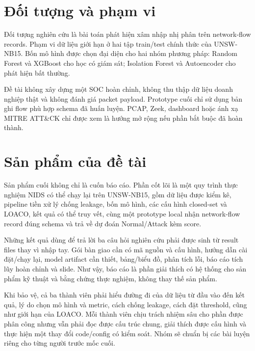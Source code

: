 \documentclass[12pt,a4paper,oneside]{report}
\begin{document}
\section{Đối tượng và phạm vi}

Đối tượng nghiên cứu là bài toán phát hiện xâm nhập nhị phân trên network-flow records. Phạm vi dữ liệu giới hạn ở hai tập train/test chính thức của UNSW-NB15. Bốn mô hình được chọn đại diện cho hai nhóm phương pháp: Random Forest và XGBoost cho học có giám sát; Isolation Forest và Autoencoder cho phát hiện bất thường.

Đề tài không xây dựng một SOC hoàn chỉnh, không thu thập dữ liệu doanh nghiệp thật và không đánh giá packet payload. Prototype cuối chỉ sử dụng bản ghi flow phù hợp schema đã huấn luyện. PCAP, Zeek, dashboard hoặc ánh xạ MITRE ATT\&CK chỉ được xem là hướng mở rộng nếu phần bắt buộc đã hoàn thành.

\clearpage
\section{Sản phẩm của đề tài}

Sản phẩm cuối không chỉ là cuốn báo cáo. Phần cốt lõi là một quy trình thực nghiệm NIDS có thể chạy lại trên UNSW-NB15, gồm dữ liệu được kiểm kê, pipeline tiền xử lý chống leakage, bốn mô hình, các cấu hình closed-set và LOACO, kết quả có thể truy vết, cùng một prototype local nhận network-flow record đúng schema và trả về dự đoán Normal/Attack kèm score.

Những kết quả dùng để trả lời ba câu hỏi nghiên cứu phải được sinh từ result files thay vì nhập tay. Gói bàn giao cần có mã nguồn và cấu hình, hướng dẫn cài đặt/chạy lại, model artifact cần thiết, bảng/biểu đồ, phân tích lỗi, báo cáo tích lũy hoàn chỉnh và slide. Như vậy, báo cáo là phần giải thích có hệ thống cho sản phẩm kỹ thuật và bằng chứng thực nghiệm, không thay thế sản phẩm.

Khi bảo vệ, cả ba thành viên phải hiểu đường đi của dữ liệu từ đầu vào đến kết quả, lý do chọn mô hình và metric, cách chống leakage, cách đặt threshold, cũng như giới hạn của LOACO. Mỗi thành viên chịu trách nhiệm sâu cho phần được phân công nhưng vẫn phải đọc được cấu trúc chung, giải thích được cấu hình và thực hiện một thay đổi code/config có kiểm soát. Nhóm sẽ chuẩn bị các bài luyện riêng cho từng người trước mốc cuối.

\end{document}
